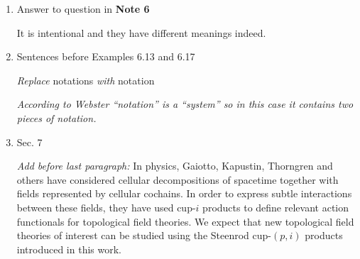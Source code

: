 \documentclass{amsart}
\theoremstyle{definition}
\newtheorem{example}[theorem]{Example}
\begin{document}
\begin{enumerate}
\begin{example}
\begin{center}
\hspace*{1cm}
\hspace*{1cm}
\end{center}
\end{example}

\item Answer to question in \textbf{Note 6} \par
It is intentional and they have different meanings indeed.

\item Sentences before Examples 6.13 and 6.17 \par
\textit{Replace} notations \textit{with} notation \par
\textit{According to Webster ``notation'' is a ``system'' so in this case it contains two pieces of notation.}

\item Sec. 7 \par
\textit{Add before last paragraph:}
In physics, Gaiotto, Kapustin, Thorngren \cite{gaiotto2016spin, kapustin2017fermionic, bhardwaj2017state} and others have considered cellular decompositions of spacetime together with fields represented by cellular cochains.
In order to express subtle interactions between these fields, they have used cup-$i$ products to define relevant action functionals for topological field theories.
We expect that new topological field theories of interest can be studied using the Steenrod cup-$(p,i)$ products introduced in this work.


\end{enumerate}
\end{document}

